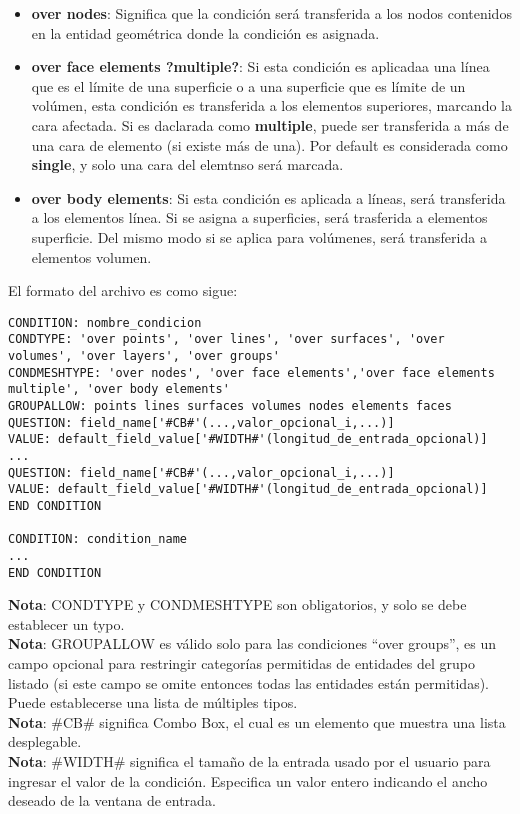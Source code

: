 \documentclass[10pt, a4paper, twocolumn]{article} %
\begin{document}
\begin{itemize}
\item \textbf{over nodes}: Significa que la condición será transferida a los nodos contenidos en la entidad geométrica donde la condición es asignada.
\item \textbf{over face elements ?multiple?}: Si esta condición es aplicadaa una línea que es el límite de una superficie o a una superficie que es límite de un volúmen, esta condición es transferida a los elementos superiores, marcando la cara afectada. Si es daclarada como \textbf{multiple}, puede ser transferida a más de una cara de elemento (si existe más de una). Por default es considerada como \textbf{single}, y solo una cara del elemtnso será marcada.
\item \textbf{over body elements}: Si esta condición es aplicada a líneas, será transferida a los elementos línea. Si se asigna a superficies, será trasferida a elementos superficie. Del mismo modo si se aplica para volúmenes, será transferida a elementos volumen.
\end{itemize}

El formato del archivo es como sigue:

\begin{lstlisting}
CONDITION: nombre_condicion
CONDTYPE: 'over points', 'over lines', 'over surfaces', 'over volumes', 'over layers', 'over groups'
CONDMESHTYPE: 'over nodes', 'over face elements','over face elements multiple', 'over body elements'
GROUPALLOW: points lines surfaces volumes nodes elements faces
QUESTION: field_name['#CB#'(...,valor_opcional_i,...)]
VALUE: default_field_value['#WIDTH#'(longitud_de_entrada_opcional)]
...
QUESTION: field_name['#CB#'(...,valor_opcional_i,...)]
VALUE: default_field_value['#WIDTH#'(longitud_de_entrada_opcional)]
END CONDITION

CONDITION: condition_name
...
END CONDITION
\end{lstlisting}

\textbf{Nota}: CONDTYPE y CONDMESHTYPE son obligatorios, y solo se debe establecer un typo.\\
\textbf{Nota}: GROUPALLOW es válido solo para las condiciones ``over groups'', es un campo opcional para restringir categorías permitidas de entidades del grupo listado (si este campo se omite entonces todas las entidades están permitidas). Puede establecerse una lista de múltiples tipos.\\
\textbf{Nota}: \#CB\# significa Combo Box, el cual es un elemento que muestra una lista desplegable.\\
\textbf{Nota}: \#WIDTH\# significa el tamaño de la entrada usado por el usuario para ingresar el valor de la condición. Especifica un valor entero indicando el ancho deseado de la ventana de entrada.\\
\end{document}
